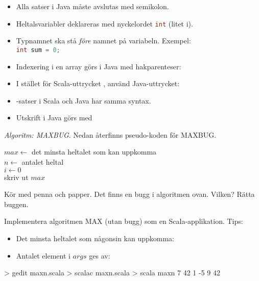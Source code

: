 \begin{itemize}[noitemsep, nolistsep]
\item Alla satser i Java måste avslutas med semikolon.
\item Heltalsvariabler deklareras med nyckelordet \lstinline[language=Java]{int} (litet i). 
\item Typnamnet ska stå \emph{före} namnet på variabeln. Exempel: \\ \lstinline[language=Java]{int sum = 0;}
\item Indexering i en array görs i Java med hakparenteser: 
\item I stället för Scala-uttrycket , använd Java-uttrycket: \\ 
\item {}-satser i Scala och Java har samma syntax.
\item Utskrift i Java görs med 
\end{itemize}


\Task \emph{Algoritm: MAXBUG}. Nedan återfinns pseudo-koden för MAXBUG. 

\begin{algorithm}[H]
 
 $max \leftarrow$ det minsta heltalet som kan uppkomma  \\
 $n \leftarrow $ antalet heltal \\
 $i \leftarrow 0$ \\
 skriv ut $max$
\end{algorithm}

\Subtask\Pen Kör med penna och papper. Det finns en bugg i algoritmen ovan. Vilken? Rätta buggen.

\Subtask Implementera algoritmen MAX (utan bugg) som en Scala-applikation. Tips:
\begin{itemize}[noitemsep, nolistsep]
\item Det minsta heltalet som någonsin kan uppkomma: 
\item Antalet element i $args$ ges av: 
\end{itemize}

\begin{REPL}
> gedit maxn.scala
> scalac maxn.scala
> scala maxn 7 42 1 -5 9
42
\end{REPL}

